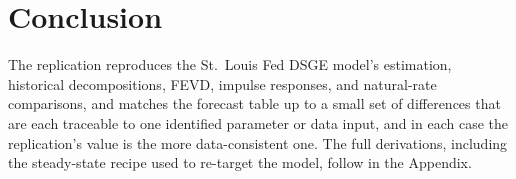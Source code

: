 \documentclass[11pt]{article}
\theoremstyle{definition}
\begin{document}
\section{Conclusion}\label{sec:conclusion}
The replication reproduces the St.\ Louis Fed DSGE model's estimation, historical decompositions, FEVD,
impulse responses, and natural-rate comparisons, and matches the forecast table up to a small set of
differences that are each traceable to one identified parameter or data input, and in each case the
replication's value is the more data-consistent one.  The full derivations, including the steady-state
recipe used to re-target the model, follow in the Appendix.

\newpage

\end{document}
